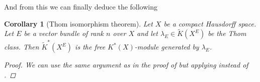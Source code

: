 \documentclass[12pt,a4paper]{amsart}
\theoremstyle{plain}
\newtheorem{cor}[thm]{Corollary}
\theoremstyle{definition}
\theoremstyle{remark}
\begin{document}
And from this we can finally deduce the following

\begin{cor}[Thom isomorphism theorem]\label{cor:generalthom}
  Let $X$ be a compact Hausdorff space.
  Let $E$ be a vector bundle of rank $n$ over $X$ and let $\lambda_{E} \in \tilde{K}(X^{E})$ be the Thom class.
  Then $\tilde{K}^{*}(X^{E})$ is the free $K^{*}(X)$-module generated by $\lambda_{E}$.
  \begin{proof}
    We can use the same argument as in the proof of  but applying  instead of .
  \end{proof}
\end{cor}



\vfill
\end{document}
